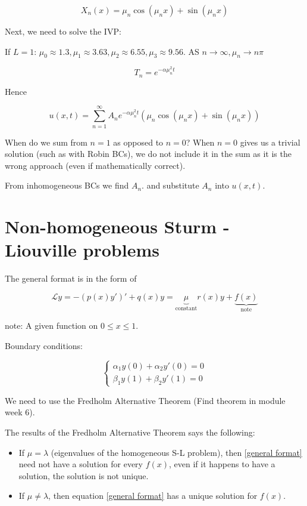 \documentclass{article}
\begin{document}
$$X_n(x) = \mu_n \cos(\mu_n x) + \sin(\mu_n x)$$

\hfill

Next, we need to solve the IVP:

If $L = 1$: $\mu_0 \approx 1.3, \mu_1 \approx 3.63, \mu_2 \approx 6.55, \mu_3 \approx 9.56$. AS $n \to \infty, \mu_n \to n \pi$

$$T_n = e^{- \alpha \mu_n^2 t}$$

Hence

$$u(x,t) = \sum_{n=1}^\infty A_n e^{- \alpha \mu_n^2 t} \left( \mu_n \cos(\mu_n x) + \sin(\mu_n x) \right)$$

When do we sum from $n = 1$ as opposed to $n = 0$? When $n = 0$ gives us a trivial solution (such as with Robin BCs), we do not include it in the sum as it is the wrong approach (even if mathematically correct). 

From inhomogeneous BCs we find $A_n$.  and substitute $A_n$ into $u(x,t)$. 


\section{Non-homogeneous Sturm - Liouville  problems}

The general format is in the form of

\begin{equation}
\label{general format}
    \mathcal{L} y = - \left( p(x) y' \right)' + q(x) y = \underbrace{\mu}_{\text{constant}} r(x) y + \underbrace{f(x)}_{\text{note}}
\end{equation}


note: A given function on $0 \leq x \leq 1$. 

Boundary conditions:

$$\left\{ \begin{matrix} \alpha_1 y(0) + \alpha_2 y'(0) = 0 \\ \beta_1 y(1) + \beta_2 y'(1) = 0 \end{matrix} \right.$$

We need to use the Fredholm Alternative Theorem (Find theorem in module week 6). 

The results of the Fredholm Alternative Theorem says the following:

\begin{itemize}
    \item If $\mu = \lambda$ (eigenvalues of the homogeneous S-L problem), then \ref{general format} need not have a solution for every $f(x)$, even if it happens to have a solution, the solution is not unique. 
    \item If $\mu \neq \lambda$, then equation \ref{general format} has a unique solution for $f(x)$. 
\end{itemize}
\end{document}
